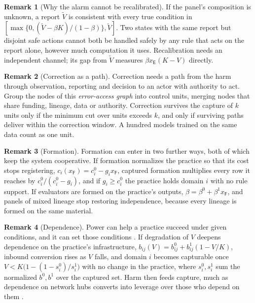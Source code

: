 \documentclass[letterpaper]{article} %
\theoremstyle{definition}
\newtheorem{remark}{Remark}
\newcommand{\dE}{\mathsf{E}}
\newcommand{\dF}{\mathsf{F}}
\begin{document}
\begin{remark}[Why the alarm cannot be recalibrated]\label{rem:indist}
If the panel's composition is unknown, a report $\tilde V$ is consistent with every true condition in $[\max\{0,(\tilde V-\beta K)/(1-\beta)\},\tilde V]$. Two states with the same report but disjoint safe actions cannot both be handled safely by any rule that acts on the report alone, however much computation it uses. Recalibration needs an independent channel; its gap from $\tilde V$ measures $\beta x_\dE(K-V)$ directly.
\end{remark}

\begin{remark}[Correction as a path]\label{rem:mincut}
Correction needs a path from the harm through observation, reporting and decision to an actor with authority to act. Group the nodes of this \emph{error-access graph} into control units, merging nodes that share funding, lineage, data or authority. Correction survives the capture of $k$ units only if the minimum cut over units exceeds $k$, and only if surviving paths deliver within the correction window. A hundred models trained on the same data count as one unit.
\end{remark}

\begin{remark}[Formation]\label{rem:formation}
Formation can enter in two further ways, both of which keep the system cooperative. If formation normalizes the practice so that its cost stops registering, $c_i(x_\dF)=c^0_i-g_ix_\dF$, captured formation multiplies every row it reaches by $c^0_i/(c^0_i-g_i)$, and if $g_i\ge c^0_i$ the practice holds domain $i$ with no rule support. If evaluators are formed on the practice's outputs, $\beta=\beta^0+\beta^1x_\dF$, and panels of mixed lineage stop restoring independence, because every lineage is formed on the same material.
\end{remark}

\begin{remark}[Dependence]\label{rem:dependence}
Power can help a practice succeed under given conditions, and it can set those conditions \citep{strange1988,lukes2005}. If degradation of $V$ deepens dependence on the practice's infrastructure, $b_{ij}(V)=b^0_{ij}+b^1_{ij}(1-V/K)$, inbound conversion rises as $V$ falls, and domain $i$ becomes capturable once $V<K\big(1-(1-s^0_i)/s^1_i\big)$ with no change in the practice, where $s^0_i,s^1_i$ sum the normalized $b^0,b^1$ over the captured set. Harm then feeds capture, much as dependence on network hubs converts into leverage over those who depend on them \citep{farrell2019}.
\end{remark}
\end{document}
